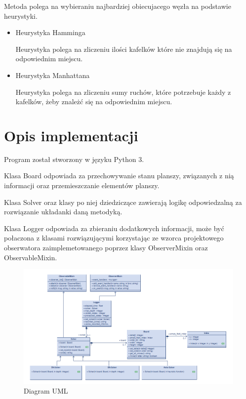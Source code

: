 \documentclass{classrep}
\begin{document}
{\begin{itemize}
            Metoda polega na wybieraniu najbardziej obiecujacego węzła na podstawie heurystyki.
            \begin{itemize}
                \item Heurystyka Hamminga

                Heurystyka polega na zliczeniu ilości kafelków które nie znajdują się na odpowiednim miejscu.
                \item Heurystyka Manhattana

                Heurystyka polega na zliczeniu sumy ruchów, które potrzebuje każdy z kafelków, żeby znależć się na odpowiednim miejscu.
            \end{itemize}
        \end{itemize}

    }\label{sec:wprowadzenie}

    \section{Opis implementacji}
    {
        Program został stworzony w języku Python 3.

        Klasa Board odpowiada za przechowywanie stanu planszy, związanych z nią informacji oraz przemieszczanie elementów planszy.

    Klasa Solver oraz klasy po niej dziedziczące zawierają logikę odpowiedzalną za rozwiązanie układanki daną metodyką.

    Klasa Logger odpowiada za zbieraniu dodatkowych informacji, może być połaczona z klasami rozwiązującymi korzystając ze wzorca projektowego obserwatora zaimplemetowanego poprzez klasy ObserverMixin oraz ObservableMixin.

        \begin{figure}[!htb]
            \centering
            \includegraphics[width=\textwidth,height=\textheight,keepaspectratio]{diagram}
            \caption{Diagram UML}
            \label{fig:Diagram UML}
        \end{figure}
     \label{sec:opis-implementacji}}
\end{document}
